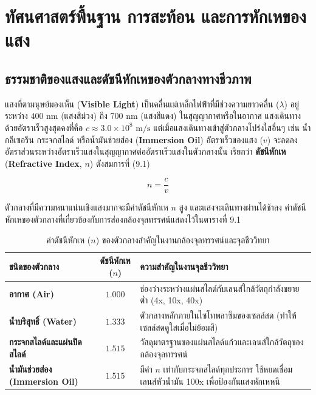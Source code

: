 \chapter{ทัศนศาสตร์พื้นฐาน การสะท้อน และการหักเหของแสง}

\section{ธรรมชาติของแสงและดัชนีหักเหของตัวกลางทางชีวภาพ}

แสงที่ตามนุษย์มองเห็น (\textbf{Visible Light}) เป็นคลื่นแม่เหล็กไฟฟ้าที่มีช่วงความยาวคลื่น ($\lambda$) อยู่ระหว่าง $400\text{ nm}$ (แสงสีม่วง) ถึง $700\text{ nm}$ (แสงสีแดง) ในสุญญากาศหรือในอากาศ แสงเดินทางด้วยอัตราเร็วสูงสุดคงที่คือ $c \approx 3.0 \times 10^8\text{ m/s}$ แต่เมื่อแสงเดินทางเข้าสู่ตัวกลางโปร่งใสอื่นๆ เช่น น้ำ กลีเซอรีน กระจกสไลด์ หรือน้ำมันช่วยส่อง (\textbf{Immersion Oil}) อัตราเร็วของแสง ($v$) จะลดลง อัตราส่วนระหว่างอัตราเร็วแสงในสุญญากาศต่ออัตราเร็วแสงในตัวกลางนั้น เรียกว่า \textbf{ดัชนีหักเห} (\textbf{Refractive Index}, $n$) ดังสมการที่ (9.1)

\begin{equation}
    n = \frac{c}{v}
\end{equation}

ตัวกลางที่มีความหนาแน่นเชิงแสงมากจะมีค่าดัชนีหักเห $n$ สูง และแสงจะเดินทางผ่านได้ช้าลง ค่าดัชนีหักเหของตัวกลางที่เกี่ยวข้องกับการส่องกล้องจุลทรรศน์แสดงไว้ใน\mbox{ตารางที่} 9.1

\begin{table}[H]
\centering
\caption{ค่าดัชนีหักเห ($n$) ของตัวกลางสำคัญในงานกล้องจุลทรรศน์และจุลชีววิทยา}
\small
\begin{tabularx}{\textwidth}{>{\bfseries}p{4.5cm} c >{\raggedright\arraybackslash}X}
\toprule
ชนิดของตัวกลาง & ดัชนีหักเห ($n$) & ความสำคัญในงานจุลชีววิทยา \\
\midrule
อากาศ (Air) & $1.000$ & ช่องว่างระหว่างแผ่นสไลด์กับเลนส์ใกล้วัตถุกำลังขยายต่ำ (4x, 10x, 40x) \\
น้ำบริสุทธิ์ (Water) & $1.333$ & ตัวกลางหลักภายในไซโทพลาซึมของเซลล์สด (ทำให้เซลล์สดดูใสเมื่อไม่ย้อมสี) \\
กระจกสไลด์และแผ่นปิดสไลด์ & $1.515$ & วัสดุมาตรฐานของแผ่นสไลด์แก้วและเลนส์ใกล้วัตถุของกล้องจุลทรรศน์ \\
น้ำมันช่วยส่อง (Immersion Oil) & $1.515$ & มีค่า $n$ เท่ากับกระจกสไลด์ทุกประการ ใช้หยดเชื่อมเลนส์หัวน้ำมัน 100x เพื่อป้องกันแสงหักเหหนี \\
\bottomrule
\end{tabularx}
\end{table}


